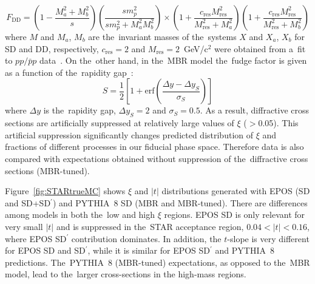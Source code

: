 \begin{equation}
F_{\textrm{DD}}=\left(1-\frac{M_a^2+M_b^2}{s}\right)\left(\frac{sm^2_p}{sm^2_p+M_a^2M_b^2}\right)\times
\left(1+\frac{c_\textrm{res}M_\textrm{res}^2}{M_\textrm{res}^2+M_a^2}\right)\left(1+\frac{c_\textrm{res}M_\textrm{res}^2}{M_\textrm{res}^2+M_b^2}\right)
\end{equation}
where $M$ and $M_{a}$, $M_{b}$ are the~invariant masses of the~systems $X$ and $X_a$, $X_b$ for SD and DD, respectively, $c_\textrm{res}=2$ and $M_\textrm{res}=2$~GeV/c$^2$ were obtained from a~fit to $pp/\bar{p}p$ data~\cite{Sjostrand:2006za}. On the~other hand, in the~\ac{MBR} model the~fudge factor is given as a function of the~rapidity gap~\cite{MBR:intro}:
\begin{equation}
S=\frac{1}{2}\left[1+\textrm{erf}\left(\frac{\Delta y-\Delta y_S}{\sigma_S}\right)\right]
\end{equation}
where $\Delta y$ is the~rapidity gap, $\Delta y_S=2$ and $\sigma_S=0.5$. As a result, diffractive cross sections are artificially suppressed at 
relatively large values of $\xi$ ($>$0.05). This artificial suppression significantly changes predicted distribution of $\xi$ and fractions of different processes in our fiducial phase space. Therefore data is also compared with expectations obtained without suppression of the~diffractive cross sections (MBR-tuned).

Figure~\ref{fig:STARtrueMC} shows $\xi$ and $|t|$ distributions generated with  EPOS (SD and SD+SD$^\prime$) and PYTHIA~8 SD (MBR and MBR-tuned). There are differences among models in both the~low and high $\xi$ regions. EPOS SD is only relevant for very small $|t|$ and is suppressed in the~STAR acceptance region, $0.04<|t|<0.16$, where EPOS SD$^\prime$ contribution dominates. In addition, the $t$-slope is  very different for EPOS SD and SD$^\prime$, while it is similar for EPOS SD$^\prime$ and PYTHIA~8 predictions. The~PYTHIA~8 (MBR-tuned) expectations, as opposed to the~MBR model,  lead
to the~larger cross-sections in the high-mass regions.
 
